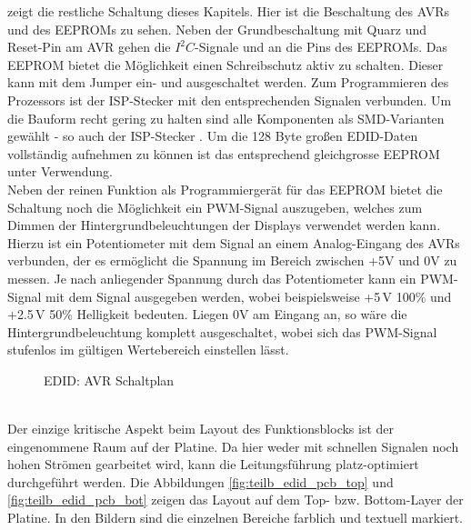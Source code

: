  zeigt die restliche Schaltung dieses Kapitels. Hier ist die Beschaltung des AVRs  und des EEPROMs  zu sehen. Neben der Grundbeschaltung mit Quarz und Reset-Pin am AVR gehen die $I^2C$-Signale  und  an die Pins des EEPROMs. Das EEPROM bietet die Möglichkeit einen Schreibschutz aktiv zu schalten. Dieser kann mit dem Jumper  ein- und ausgeschaltet werden. Zum Programmieren des Prozessors ist der ISP-Stecker mit den entsprechenden Signalen verbunden. Um die Bauform recht gering zu halten sind alle Komponenten als SMD-Varianten gewählt - so auch der ISP-Stecker . Um die 128 Byte großen EDID-Daten vollständig aufnehmen zu können ist das entsprechend gleichgrosse EEPROM  unter Verwendung. \\
Neben der reinen Funktion als Programmiergerät für das EEPROM bietet die Schaltung noch die Möglichkeit ein PWM-Signal auszugeben, welches zum Dimmen der Hintergrundbeleuchtungen der Displays verwendet werden kann. Hierzu ist ein Potentiometer mit dem Signal  an einem Analog-Eingang des AVRs verbunden, der es ermöglicht die Spannung im Bereich zwischen +5V und 0V zu messen. Je nach anliegender Spannung durch das Potentiometer kann ein PWM-Signal mit dem Signal  ausgegeben werden, wobei beispielsweise +5\,V 100\%  und +2.5\,V 50\% Helligkeit bedeuten. Liegen 0V am Eingang an, so wäre die Hintergrundbeleuchtung komplett ausgeschaltet, wobei sich das PWM-Signal stufenlos im gültigen Wertebereich einstellen lässt. 
\begin{figure}[htp]
	\center
    \caption{EDID: AVR Schaltplan}
    \label{fig:teilb_edid_avr_sch}
\end{figure}\\
Der einzige kritische Aspekt beim Layout des Funktionsblocks ist der eingenommene Raum auf der Platine. Da hier weder mit schnellen Signalen noch hohen Strömen gearbeitet wird, kann die Leitungsführung platz-optimiert durchgeführt werden. Die Abbildungen \ref{fig:teilb_edid_pcb_top} und \ref{fig:teilb_edid_pcb_bot} zeigen das Layout auf dem Top- bzw. Bottom-Layer der Platine. In den Bildern sind die einzelnen Bereiche farblich und textuell markiert.

